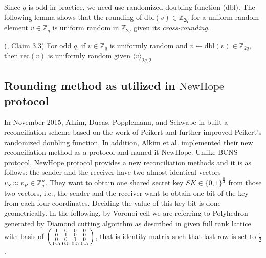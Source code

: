 Since $q$ is odd in practice, we need use randomized doubling function (dbl). The following lemma shows that the rounding of $\mathrm{dbl}(v) \in \mathbb{Z}_{2q}$ for a uniform random element $v \in \mathbb{Z}_{q}$ is uniform random in $\mathbb{Z}_{2q}$ given its \textit{cross-rounding}.



\begin{lemma}
    \normalfont
    (\cite{peikert2014lattice}, Claim 3.3)
    For odd $q$, if $v \in \mathbb{Z}_{q}$ is uniformly random and $\bar{v} \leftarrow \mathrm{dbl}(v) \in \mathbb{Z}_{2q}$, then $\text{rec}(\bar{v})$ is uniformly random given $\langle \bar{v} \rangle_{2q, 2}$
\end{lemma}




\subsection{Rounding method as utilized in $\mathrm{NewHope}$ protocol}
In November 2015, Alkim, Ducas, Popplemann, and Schwabe in \cite{alkim2015post} built a reconciliation scheme based on the work of Peikert and further improved Peikert's randomized doubling function. In addition, Alkim et al. implemented their new reconciliation method as a protocol and named it $\mathrm{NewHope}$. Unlike $\mathrm{BCNS}$ protocol, $\mathrm{NewHope}$ protocol provides a new reconciliation methods and it is as follows: the sender and the receiver have two almost identical vectors $v_{S} \approx v_{R} \in \mathbb{Z}^{n}_{q}$. They want to obtain one shared secret key $SK \in \{0, 1\}^{\frac{n}{4}}$ from those two vectors, i.e., the sender and the receiver want to obtain one bit of the key from each four coordinates. Deciding the value of this key bit is done geometrically. In the following, by Voronoi cell we are referring to Polyhedron generated by Diamond cutting algorithm as described in \cite{481786} given full rank lattice with basis of $\begin{psmallmatrix}
    1   &   0   &   0   &   0\\
    0   &   1   &   0   &   0\\
    0   &   0   &   1   &   0\\
    0.5   &   0.5   &   0.5   &   0.5
\end{psmallmatrix}$, that is identity matrix such that last row is set to $\frac{1}{2}$.




